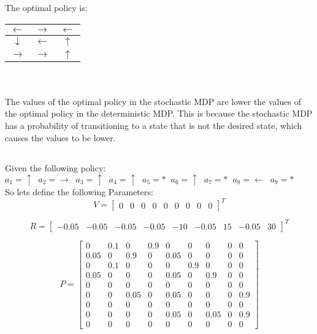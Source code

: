 \documentclass{article}
\begin{document}
    The optimal policy is: \\
    \begin{tabular}{|c|c|c|}
        \hline
            $\leftarrow $ & $\rightarrow $ & $\leftarrow $ \\
        \hline
            $\downarrow $ & $\leftarrow $ & $\uparrow $ \\
        \hline
            $\rightarrow $ & $\rightarrow $ & $\uparrow $ \\
        \hline
    \end{tabular}\\ \\
    The values of the optimal policy in the stochastic MDP are lower the values of the optimal policy in the deterministic MDP. This is because the stochastic MDP has a probability of transitioning to a state that is not the desired state, which causes the values to be lower.

    \subsection{}
    Given the following policy: $ a_1 = \uparrow \;\; a_2 = \rightarrow \;\; a_3 = \uparrow \;\;  a_4 = \uparrow \;\; a_5 = * \;\; a_6 = \uparrow \;\; a_7 = * \;\; a_8 = \leftarrow \;\; a_9 = *  $\\
    So lets define the following Parameters:
    \[
    V = \begin{bmatrix} 0 & 0 & 0 & 0 & 0 & 0 & 0 & 0 & 0 \end{bmatrix}^T
    \]

    \[
    R = \begin{bmatrix} -0.05 & -0.05 & -0.05 & -0.05 & -10 & -0.05 & 15 & -0.05 & 30 \end{bmatrix}^T
    \]

    \[
    P = \begin{bmatrix}
        0 & 0.1 & 0 & 0.9 & 0 & 0 & 0 & 0 & 0\\
        0.05 & 0 & 0.9 & 0 & 0.05 & 0 & 0 & 0 & 0\\
        0 & 0.1 & 0 & 0 & 0 & 0.9 & 0 & 0 & 0\\
        0.05 & 0 & 0 & 0 & 0.05 & 0 & 0.9 & 0 & 0\\
        0 & 0 & 0 & 0 & 0 & 0 & 0 & 0 & 0\\
        0 & 0 & 0.05 & 0 & 0.05 & 0 & 0 & 0 & 0.9\\
        0 & 0 & 0 & 0 & 0 & 0 & 0 & 0 & 0\\
        0 & 0 & 0 & 0 & 0.05 & 0 & 0.05 & 0 & 0.9\\
        0 & 0 & 0 & 0 & 0 & 0 & 0 & 0 & 0
    \end{bmatrix}
    \]
\end{document}
